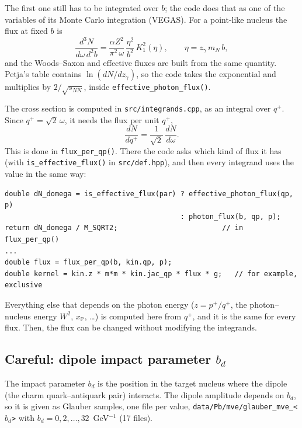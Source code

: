 \documentclass{article}
\begin{document}
\noindent The first one still has to be integrated over $b$; the code does
that as one of the variables of its Monte Carlo integration (VEGAS). For a
point-like nucleus the flux at fixed $b$ is
\begin{equation}
  \frac{d^3N}{d\omega\,d^2b} = \frac{\alpha Z^2}{\pi^2\,\omega}\,
  \frac{\eta^2}{b^2}\,K_1^2(\eta), \qquad \eta = z_\gamma\,m_N\,b ,
\end{equation}
and the Woods--Saxon and effective fluxes are built from the same quantity.
Petja's table contains $\ln(dN/dz_\gamma)$, so the code takes the exponential
and multiplies by $2/\sqrt{s_{NN}}$, inside
\texttt{effective\_photon\_flux()}. 

The cross section is computed in \texttt{src/integrands.cpp}, as an integral
over $q^+$. Since $q^+ = \sqrt2\,\omega$, it needs the flux per unit $q^+$,
\begin{equation}
  \frac{dN}{dq^+} = \frac{1}{\sqrt2}\,\frac{dN}{d\omega} .
\end{equation}
This is done in \texttt{flux\_per\_qp()}. There the code asks which kind of
flux it has (with \texttt{is\_effective\_flux()} in \texttt{src/def.hpp}), and
then every integrand uses the value in the same way:
\begin{verbatim}
double dN_domega = is_effective_flux(par) ? effective_photon_flux(qp, p)
                                          : photon_flux(b, qp, p);
return dN_domega / M_SQRT2;                         // in flux_per_qp()
...
double flux = flux_per_qp(b, kin.qp, p);
double kernel = kin.z * m*m * kin.jac_qp * flux * g;   // for example, exclusive
\end{verbatim}
Everything else that depends on the photon energy ($z = p^+/q^+$, the
photon--nucleus energy $W^2$, $x_\mathbb{P}$, \dots) is computed here from
$q^+$, and it is the same for every flux. Then, the flux can be changed without modifying the integrands.

\subsection*{Careful: dipole impact parameter $b_d$}

The impact parameter $b_d$ is the position in the target nucleus
where the dipole (the charm quark--antiquark pair) interacts. The dipole
amplitude depends on $b_d$, so it is given as Glauber samples, one file per
value, \texttt{data/Pb/mve/glauber\_mve\_<}$b_d$\texttt{>} with
$b_d = 0, 2, \dots, 32$~GeV$^{-1}$ (17 files).
\end{document}
